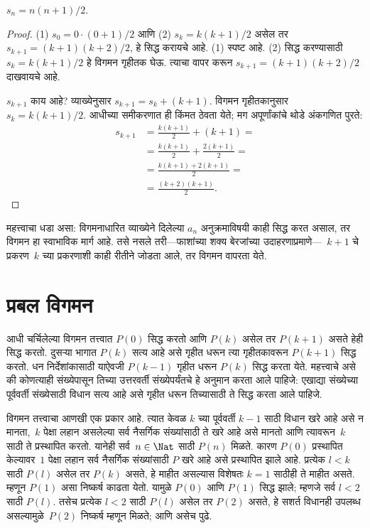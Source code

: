 \begin{prop}
  $s_n = n(n+1)/2$.
\end{prop}

\begin{proof}
(1) $s_0 = 0\cdot(0 + 1)/2$ आणि (2) $s_k = k(k+1)/2$ असेल तर $s_{k+1} = (k+1)(k+2)/2$, हे सिद्ध करायचे आहे. (1) स्पष्ट आहे. (2) सिद्ध करण्यासाठी $s_k = k(k+1)/2$ हे विगमन गृहीतक घेऊ. त्याचा वापर करून $s_{k+1} = (k+1)(k+2)/2$ दाखवायचे आहे.

$s_{k+1}$ काय आहे? व्याख्येनुसार $s_{k+1} = s_k + (k+1)$. विगमन गृहीतकानुसार $s_k = k(k+1)/2$. आधीच्या समीकरणात ही किंमत ठेवता येते; मग अपूर्णांकांचे थोडे अंकगणित पुरते:
\begin{align*}
    s_{k+1} & = \frac{k(k+1)}{2} + (k+1) = {}\\
    & = \frac{k(k+1)}{2} + \frac{2(k+1)}{2} = {}\\
    & = \frac{k(k+1) + 2(k+1)}{2} = {}\\
    & = \frac{(k+2)(k+1)}{2}.
\end{align*}
\end{proof}

महत्त्वाचा धडा असा: विगमनाधारित व्याख्येने दिलेल्या $a_n$ अनुक्रमाविषयी काही सिद्ध करत असाल, तर विगमन हा स्वाभाविक मार्ग आहे. तसे नसले तरी---फाशांच्या शक्य बेरजांच्या उदाहरणाप्रमाणे---~$k+1$ चे प्रकरण~$k$ च्या प्रकरणाशी काही रीतीने जोडता आले, तर विगमन वापरता येते.












\section{प्रबल विगमन}\label{mth:ind:str:sec}

आधी चर्चिलेल्या विगमन तत्त्वात $P(0)$ सिद्ध करतो आणि $P(k)$ असेल तर $P(k+1)$ असते हेही सिद्ध करतो. दुसऱ्या भागात $P(k)$ सत्य आहे असे गृहीत धरून त्या गृहीतकावरून $P(k+1)$ सिद्ध करतो. धन निर्देशांकासाठी याऐवजी $P(k-1)$ गृहीत धरून $P(k)$ सिद्ध करता येते. महत्त्वाचे असे की कोणत्याही संख्येपासून तिच्या उत्तरवर्ती संख्येपर्यंतचे हे अनुमान करता आले पाहिजे: एखाद्या संख्येच्या पूर्ववर्ती संख्येसाठी विधान सत्य आहे असे गृहीत धरून तिच्यासाठी ते सिद्ध करता आले पाहिजे.

विगमन तत्त्वाचा आणखी एक प्रकार आहे. त्यात केवळ $k$ च्या पूर्ववर्ती $k-1$ साठी विधान खरे आहे असे न मानता,~$k$ पेक्षा लहान असलेल्या सर्व नैसर्गिक संख्यांसाठी ते खरे आहे असे मानतो आणि त्यावरून~$k$ साठी ते प्रस्थापित करतो. यानेही सर्व~$n \in \Nat$ साठी $P(n)$ मिळते. कारण $P(0)$ प्रस्थापित केल्यावर~$1$ पेक्षा लहान सर्व नैसर्गिक संख्यांसाठी $P$ खरे आहे असे प्रस्थापित झाले आहे. प्रत्येक $l<k$ साठी $P(l)$ असेल तर $P(k)$ असते, हे माहीत असल्यास विशेषतः $k=1$ साठीही ते माहीत असते. म्हणून $P(1)$ असा निष्कर्ष काढता येतो. यामुळे $P(0)$ आणि $P(1)$ सिद्ध झाले; म्हणजे सर्व $l<2$ साठी $P(l)$. तसेच प्रत्येक $l<2$ साठी $P(l)$ असेल तर $P(2)$ असते, हे सशर्त विधानही उपलब्ध असल्यामुळे~$P(2)$ निष्कर्ष म्हणून मिळते; आणि असेच पुढे.

